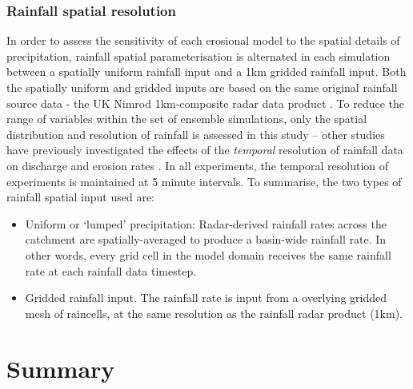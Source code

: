 \subsubsection{Rainfall spatial resolution}
In order to assess the sensitivity of each erosional model to the spatial details of precipitation, rainfall spatial parameterisation is alternated in each simulation between a spatially uniform rainfall input and a 1km gridded rainfall input. Both the spatially uniform and gridded inputs are based on the same original rainfall source data - the UK Nimrod 1km-composite radar data product \citep{metoffice2003nimrod}. To reduce the range of variables within the set of ensemble simulations, only the spatial distribution and resolution of rainfall is assessed in this study -- other studies have previously investigated the effects of the \textit{temporal} resolution of rainfall data on discharge and erosion rates \citep{nicotina2008impact,Coulthard2013,coulthard2016sensitivity}. In all experiments, the temporal resolution of experiments is maintained at 5 minute intervals. To summarise, the two types of rainfall spatial input used are: 

\begin{itemize}
\item Uniform or `lumped' precipitation: Radar-derived rainfall rates across the catchment are spatially-averaged to produce a basin-wide rainfall rate. In other words, every grid cell in the model domain receives the same rainfall rate at each rainfall data timestep.
\item Gridded rainfall input. The rainfall rate is input from a overlying gridded mesh of raincells, at the same resolution as the rainfall radar product (1km).
\end{itemize}

%

\section{Summary}


